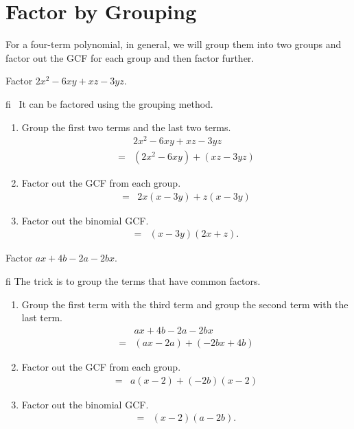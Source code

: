 \documentclass[en,12pt]{elegantbook}
\providecommand{\tightlist}{%
  \setlength{\itemsep}{0pt}\setlength{\parskip}{0pt}}
\providecommand{\tightlist}{%
  \setlength{\itemsep}{0pt}\setlength{\parskip}{0pt}}
\let\BeginKnitrBlock\begin \let\EndKnitrBlock\end
\begin{document}
\hypertarget{factor-by-grouping}{%
\section{Factor by Grouping}\label{factor-by-grouping}}

For a four-term polynomial, in general, we will group them into two groups and factor out the GCF for each group and then factor further.

\BeginKnitrBlock{example}
\protect\hypertarget{exm:unnamed-chunk-10}{}{\label{exm:unnamed-chunk-10} }
Factor \(2x^2-6xy+xz-3yz\).
\EndKnitrBlock{example}

\BeginKnitrBlock{solution}
fi{}~
It can be factored using the grouping method.

\begin{enumerate}
\def\labelenumi{\arabic{enumi}.}
\tightlist
\item
  Group the first two terms and the last two terms.
  \[
   \begin{aligned}
   &2x^2-6xy+xz-3yz\\
   =&(2x^2-6xy)+(xz-3yz)
   \end{aligned}
  \]
\item
  Factor out the GCF from each group.\\
  \[
   \begin{aligned}
   =&2x(x-3y)+z(x-3y)
   \end{aligned}
  \]
\item
  Factor out the binomial GCF.
  \[
   \begin{aligned}
   =&(x-3y)(2x+z).
   \end{aligned}
  \]
\end{enumerate}
\EndKnitrBlock{solution}

\BeginKnitrBlock{example}
\protect\hypertarget{exm:unnamed-chunk-12}{}{\label{exm:unnamed-chunk-12} }
Factor \(ax+4b-2a-2bx\).
\EndKnitrBlock{example}

\BeginKnitrBlock{solution}
fi{}
The trick is to group the terms that have common factors.

\begin{enumerate}
\def\labelenumi{\arabic{enumi}.}
\tightlist
\item
  Group the first term with the third term and group the second term with the last term.
  \[
   \begin{aligned}
   &ax+4b-2a-2bx\\
   =&(ax-2a)+(-2bx+4b)
   \end{aligned}
   \]
\item
  Factor out the GCF from each group.
  \[
   \begin{aligned}
   =&a(x-2)+(-2b)(x-2)
   \end{aligned}
   \]
\item
  Factor out the binomial GCF.
  \[
   \begin{aligned}
   =&(x-2)(a-2b).
   \end{aligned}
   \]
\end{enumerate}
\EndKnitrBlock{solution}
\end{document}
